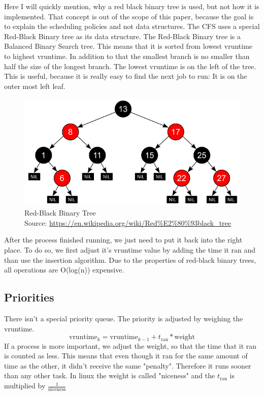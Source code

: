 Here I will quickly mention, why a red black binary tree is used, but not how it is implemented.
That concept is out of the scope of this paper, because the goal is to explain the scheduling policies and not data structures.
The CFS uses a special Red-Black Binary tree as its data structure.
The Red-Black Binary tree is a Balanced Binary Search tree.
This means that it is sorted from lowest vruntime to highest vruntime.
In addition to that the smallest branch is no smaller than half the size of the longest branch.
The lowest vruntime is on the left of the tree.
This is useful, because it is really easy to find the next job to run: It is on the outer most left leaf.

\begin{figure}[h]
    \centering
    \includegraphics[width=\textwidth]{Assets/Red-Black-Tree.png}
    \caption{Red-Black Binary Tree\\Source: \url{https://en.wikipedia.org/wiki/Red\%E2\%80\%93black_tree}}
    \label{fig:stride-scheduling}
\end{figure}

After the process finished running, we just need to put it back into the right place.
To do so, we first adjust it's vruntime value by adding the time it ran and than use the insertion algorithm.
Due to the properties of red-black binary trees, all operations are O(log(n)) expensive.

\subsection{Priorities}

There isn't a special priority queue. The priority is adjusted by weighing the vruntime.
$$ \text{vruntime}_k = \text{vruntime}_{k-1} + t_{\text{ran}}*\text{weight} $$
If a process is more important, we adjust the weight, so that the time that it ran is counted as less. 
This means that even though it ran for the same amount of time as the other, it didn't receive the same "penalty".
Therefore it runs sooner than any other task.
In linux the weight is called "niceness" and the $t_{\text{ran}}$ is multiplied by $\frac{1}{\text{niceness}}$


